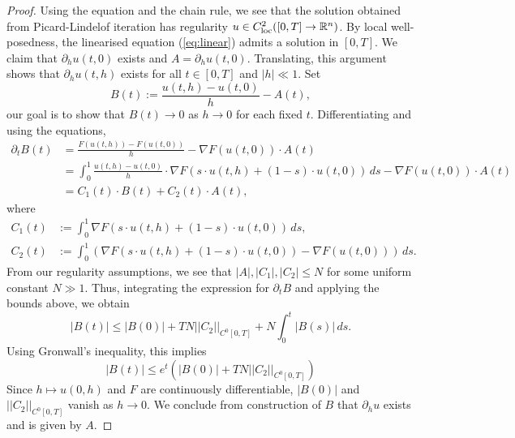 \begin{proof}
	Using the equation and the chain rule, we see that the solution obtained from Picard-Lindelof iteration has regularity $u \in C^2_{\mathrm{loc}} ([0, T] \to \mathbb R^n)$. By local well-posedness, the linearised equation (\ref{eq:linear}) admits a solution in $[0, T]$. We claim that $\partial_h u(t, 0)$ exists and $A = \partial_h u (t, 0)$. Translating, this argument shows that $\partial_h u (t, h)$ exists for all $t \in [0, T]$ and $|h| \ll 1$. Set
		\[ B(t) := \frac{u(t, h) - u(t, 0)}{h} - A(t) , \]
	our goal is to show that $B (t) \to 0$ as $h \to 0$ for each fixed $t$. Differentiating and using the equations, 
		\begin{align*}
			\partial_t B (t)
				&= \frac{F(u(t, h)) - F(u(t, 0))}{h} - \nabla F(u(t, 0)) \cdot A(t)  \\
				&=  \int_0^1 \frac{u(t, h) - u(t, 0)}{h} \cdot \nabla F(s \cdot u(t, h) + (1 - s) \cdot u (t, 0)) \, ds - \nabla F(u(t, 0)) \cdot A(t) \\
				&= C_1 (t) \cdot B(t) + C_2 (t) \cdot A(t),
		\end{align*}	
	where
		\begin{align*}
			C_1 (t) 
				&:=\int_0^1 \nabla F(s \cdot u(t, h) + (1 - s) \cdot u (t, 0)) \, ds, \\
			C_2 (t)
				&:= \int_0^1  \left(\nabla F(s\cdot u(t, h) + (1 - s)\cdot u (t, 0)) - \nabla F (u(t, 0))\right)\, ds .
		\end{align*}	
	From our regularity assumptions, we see that $|A|, |C_1|, |C_2| \leq N$ for some uniform constant $N \gg 1$. Thus, integrating the expression for $\partial_t B$ and applying the bounds above, we obtain 
		\[ |B(t)| \leq |B(0)| + TN ||C_2||_{C^0[0, T]}  + N \int_0^t |B(s)| \, ds.  \]	
	Using Gronwall's inequality, this implies
		\[ |B(t)| \leq e^{t} \left( |B(0)| + TN ||C_2||_{C^0[0, T]} \right)  \]	
	Since $h \mapsto u(0, h)$ and $F$ are continuously differentiable, $|B(0)|$ and $||C_2||_{C^0[0, T]}$ vanish as $h \to 0$. We conclude from construction of $B$ that $\partial_h u$ exists and is given by $A$. 
	

\end{proof}
